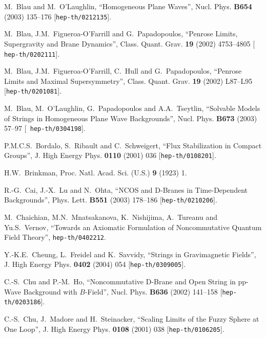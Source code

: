 \documentclass[11pt,a4paper]{article}
\begin{document}
\begin{thebibliography}{99}
 M.~Blau and M.~O'Laughlin, ``Homogeneous Plane Waves'',
  Nucl. Phys. {\bf B654} (2003) 135--176 [{\tt hep-th/0212135}].

 M.~Blau, J.M.~Figueroa-O'Farrill and G.~Papadopoulos,
  ``Penrose Limits, Supergravity and Brane Dynamics'',
  Class. Quant. Grav. {\bf 19} (2002) 4753--4805 [{\tt
  hep-th/0202111}].

 M.~Blau, J.M.~Figueroa-O'Farrill, C.~Hull and
  G.~Papadopoulos, ``Penrose Limits and Maximal Supersymmetry'',
  Class. Quant. Grav. {\bf 19} (2002) L87--L95 [{\tt hep-th/0201081}].

 M.~Blau, M.~O'Laughlin, G.~Papadopoulos and
  A.A.~Tseytlin, ``Solvable Models of Strings in Homogeneous Plane
  Wave Backgrounds'', Nucl. Phys. {\bf B673} (2003) 57--97 [{\tt
    hep-th/0304198}].

 P.M.C.S.~Bordalo, S.~Ribault and C.~Schweigert, ``Flux
  Stabilization in Compact Groups'', J. High Energy Phys. {\bf 0110}
  (2001) 036 [{\tt hep-th/0108201}].

 H.W.~Brinkman, Proc. Natl. Acad. Sci. (U.S.) {\bf 9}
  (1923) 1.

 R.-G.~Cai, J.-X.~Lu and N.~Ohta, ``NCOS and D-Branes in
  Time-Dependent Backgrounds'', Phys. Lett. {\bf B551} (2003) 178--186
  [{\tt hep-th/0210206}].

 M.~Chaichian, M.N.~Mnatsakanova, K.~Nishijima,
  A.~Tureanu and Yu.S.~Vernov, ``Towards an Axiomatic Formulation of
  Noncommutative Quantum Field Theory'', {\tt hep-th/0402212}.

 Y.-K.E.~Cheung, L.~Freidel and K.~Savvidy, ``Strings in
  Gravimagnetic Fields'', J. High Energy Phys. {\bf 0402} (2004) 054
  [{\tt hep-th/0309005}].

 C.-S.~Chu and P.-M.~Ho, ``Noncommutative D-Brane and
  Open String in pp-Wave Background with $B$-Field'', Nucl. Phys. {\bf
    B636} (2002) 141--158 [{\tt hep-th/0203186}].

 C.-S.~Chu, J.~Madore and H.~Steinacker, ``Scaling
  Limits of the Fuzzy Sphere at One Loop'', J. High Energy Phys. {\bf
    0108} (2001) 038 [{\tt hep-th/0106205}].


\end{thebibliography}
\end{document}
